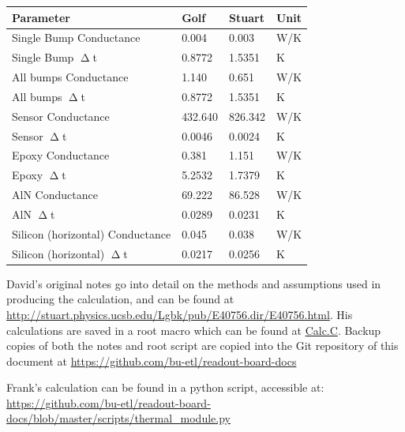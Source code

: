 \documentclass[11pt]{article}
\begin{document}
\begin{center}
  \begin{tabular}{llll}
    \textbf{Parameter}               & \textbf{Golf} & \textbf{Stuart} & \textbf{Unit} \\\midrule
    Single Bump Conductance          & 0.004         & 0.003           & W/K           \\
    Single Bump $\upDelta$t          & 0.8772        & 1.5351          & K             \\
    All bumps Conductance            & 1.140         & 0.651           & W/K           \\
    All bumps $\upDelta$t            & 0.8772        & 1.5351          & K             \\
    Sensor Conductance               & 432.640       & 826.342         & W/K           \\
    Sensor $\upDelta$t               & 0.0046        & 0.0024          & K             \\
    Epoxy Conductance                & 0.381         & 1.151           & W/K           \\
    Epoxy $\upDelta$t                & 5.2532        & 1.7379          & K             \\
    AlN Conductance                  & 69.222        & 86.528          & W/K           \\
    AlN $\upDelta$t                  & 0.0289        & 0.0231          & K             \\
    Silicon (horizontal) Conductance & 0.045         & 0.038           & W/K           \\
    Silicon (horizontal) $\upDelta$t & 0.0217        & 0.0256          & K             \\
  \end{tabular}
\end{center}

David's original notes go into detail on the methods and assumptions used in producing the calculation, and can be found at \url{http://stuart.physics.ucsb.edu/Lgbk/pub/E40756.dir/E40756.html}.
His calculations are saved in a root macro which can be found at \href{http://stuart.physics.ucsb.edu/Lgbk/pub/E40756.dir/Calc.C}{Calc.C}.
Backup copies of both the notes and root script are copied into the Git repository of this document at \url{https://github.com/bu-etl/readout-board-docs}

Frank's calculation can be found in a python script, accessible at: \url{https://github.com/bu-etl/readout-board-docs/blob/master/scripts/thermal_module.py}
\end{document}
